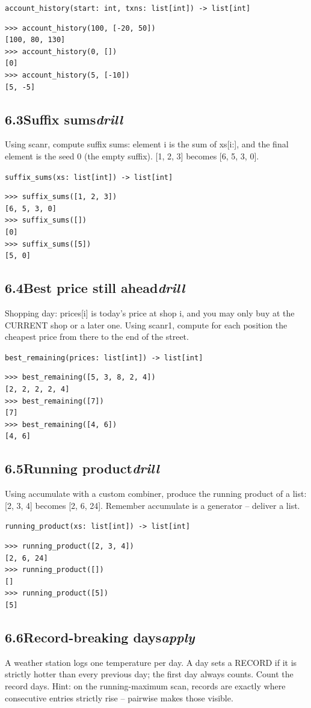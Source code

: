 \documentclass[10pt,letterpaper]{book}
\begin{document}
\noindent\texttt{account\_history(start: int, txns: list[int]) -> list[int]}
\begin{lstlisting}[style=ex]
>>> account_history(100, [-20, 50])
[100, 80, 130]
>>> account_history(0, [])
[0]
>>> account_history(5, [-10])
[5, -5]
\end{lstlisting}
\subsection*{6.3\quad Suffix sums\hfill\textnormal{\textit{drill}}}
Using scanr, compute suffix sums: element i is the sum of xs[i:], and the final element is the seed 0 (the empty suffix). [1, 2, 3] becomes [6, 5, 3, 0].

\noindent\texttt{suffix\_sums(xs: list[int]) -> list[int]}
\begin{lstlisting}[style=ex]
>>> suffix_sums([1, 2, 3])
[6, 5, 3, 0]
>>> suffix_sums([])
[0]
>>> suffix_sums([5])
[5, 0]
\end{lstlisting}
\subsection*{6.4\quad Best price still ahead\hfill\textnormal{\textit{drill}}}
Shopping day: prices[i] is today's price at shop i, and you may only buy at the CURRENT shop or a later one. Using scanr1, compute for each position the cheapest price from there to the end of the street.

\noindent\texttt{best\_remaining(prices: list[int]) -> list[int]}
\begin{lstlisting}[style=ex]
>>> best_remaining([5, 3, 8, 2, 4])
[2, 2, 2, 2, 4]
>>> best_remaining([7])
[7]
>>> best_remaining([4, 6])
[4, 6]
\end{lstlisting}
\subsection*{6.5\quad Running product\hfill\textnormal{\textit{drill}}}
Using accumulate with a custom combiner, produce the running product of a list: [2, 3, 4] becomes [2, 6, 24]. Remember accumulate is a generator -- deliver a list.

\noindent\texttt{running\_product(xs: list[int]) -> list[int]}
\begin{lstlisting}[style=ex]
>>> running_product([2, 3, 4])
[2, 6, 24]
>>> running_product([])
[]
>>> running_product([5])
[5]
\end{lstlisting}
\subsection*{6.6\quad Record-breaking days\hfill\textnormal{\textit{apply}}}
A weather station logs one temperature per day. A day sets a RECORD if it is strictly hotter than every previous day; the first day always counts. Count the record days. Hint: on the running-maximum scan, records are exactly where consecutive entries strictly rise -- pairwise makes those visible.
\end{document}
